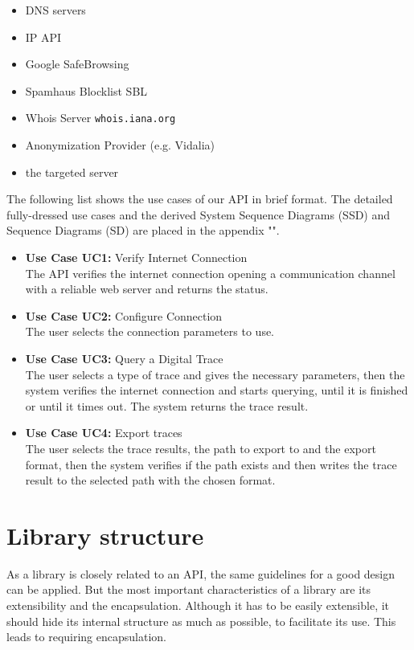 \documentclass[
	a4paper,					10pt,							twoside,					openright,				notitlepage,			parskip=half,			]{scrreprt}
\begin{document}
\begin{itemize}
\item{\gls{DNS} servers}
\item{\gls{IP} \gls{API}}
\item{Google SafeBrowsing}
\item{Spamhaus Blocklist \gls{SBL}}
\item{Whois Server \verb|whois.iana.org|}
\item{Anonymization Provider (e.g. Vidalia)}
\item{the targeted server}
\end{itemize}

The following list shows the use cases of our \gls{API} in brief format. The detailed fully-dressed use cases 
and the derived System Sequence Diagrams (\gls{SSD}) and Sequence Diagrams (\gls{SD}) are placed in the appendix
"".
	\begin{itemize}
		\item\textbf{Use Case UC1:} Verify Internet Connection\\
		The API verifies the internet connection opening a communication channel with a reliable web server and returns the status.
		\item\textbf{Use Case UC2:} Configure Connection\\
		The user selects the connection parameters to use.
		\newpage
		\item\textbf{Use Case UC3:} Query a Digital Trace\\
		The user selects a type of trace and gives the necessary parameters, 
		then the system verifies the internet connection 
		and starts querying, until it is finished or until it times out.
		The system returns the trace result.
		\item\textbf{Use Case UC4:} Export traces \\
		The user selects the trace results, the path to export to and the export format,
		then the system verifies if the path exists and 
		then writes the trace result to the selected path with the chosen format.
	\end{itemize}	

\section{Library structure}
\label{sec:api_libstruct}

As a library is closely related to an \gls{API}, the same guidelines for a good design can be applied. 
But the most important characteristics of a library are its extensibility and the encapsulation. 
Although it has to be easily extensible, it should hide its internal structure as much as possible,
to facilitate its use. This leads to requiring encapsulation. 
 
\end{document}
